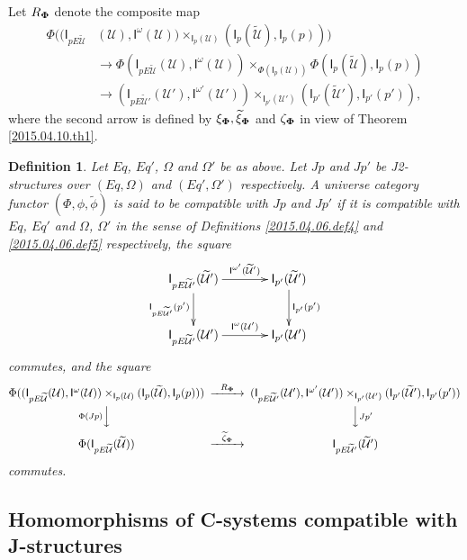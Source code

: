 \documentclass[12pt]{article}
\numberwithin{equation}{section}
\newtheorem{definition}[proposition]{Definition}
\newcommand{\sr}{\rightarrow}
\newcommand{\wt}{\widetilde}
\newcommand{\U}{\mathcal{U}}
\newcommand{\I}{\mathsf{I}}
\begin{document}
%
Let $R_{\bf\Phi}$ denote the composite map
%
\begin{align*}
  \Phi((\I_{pE\wt{\U}}&(\U), \I^{\omega}(\U))\times_{\I_p(\U)} (\I_p(\wt{\U}), \I_p(p))) \\
      & \sr \Phi(\I_{pE\wt{\U}}(\U), \I^{\omega}(\U))\times_{\Phi(\I_p(\U))}\Phi(\I_p(\wt{\U}), \I_p(p)) \\
      & \sr (\I_{pE\wt{\U}'}(\U'),\I^{\omega'}(\U'))\times_{\I_{p'}(\U')}(\I_{p'}(\wt{\U}'),\I_{p'}(p')),
\end{align*}
%
where the second arrow is defined by $\xi_{\bf\Phi}, \wt{\xi}_{\bf\Phi}$ and
$\zeta_{\bf\Phi}$ in view of Theorem \ref{2015.04.10.th1}.
%
\begin{definition}
\label{2015.04.06.def6} Let $Eq$, $Eq'$, $\Omega$ and $\Omega'$ be as
above. Let $Jp$ and $Jp'$ be J2-structures over $(Eq,\Omega)$ and
$(Eq',\Omega')$ respectively.  A universe category functor
$(\Phi,\phi,\wt{\phi})$ is said to be compatible with $Jp$ and $Jp'$ if it is
compatible with $Eq$, $Eq'$ and $\Omega$, $\Omega'$ in the sense of Definitions
\ref{2015.04.06.def4} and \ref{2015.04.06.def5} respectively, the square
%
$$
\begin{xy}
          \xymatrix@C=3pc{ \I_{pE\wt{\U}'}(\wt{\U}')
            \ar[r]^-{\I^{\omega'}(\wt{\U}')} \ar[d]_-{\I_{pE\wt{\U}'}(p')} &
            \I_{p'}(\wt{\U}')\ar[d]^-{\I_{p'}(p')}\\ \I_{pE\wt{\U}'}(\U')
            \ar[r]^-{\I^{\omega}(\U')} & \I_{p'}(\U') }
\end{xy}
$$
commutes, and the square
$$
\begin{CD}
\Phi((\I_{pE\wt{\U}}(\U), \I^{\omega}(\U))\times_{\I_p(\U)} (\I_p(\wt{\U}), \I_p(p)))
@>R_{\bf\Phi}>>
(\I_{pE\wt{\U}'}(\U'),\I^{\omega'}(\U'))\times_{\I_{p'}(\U')}(\I_{p'}(\wt{\U}'),\I_{p'}(p'))\\ @V\Phi(Jp)
VV @VVJp' V\\ \Phi(\I_{pE\wt{\U}}(\wt{\U})) @>\wt{\zeta}_{\bf\Phi}>>
\I_{pE\wt{\U}'}(\wt{\U}')
\end{CD}
$$
%
commutes.
\end{definition}




\subsection{Homomorphisms of C-systems compatible with J-structures}
%
\end{document}
